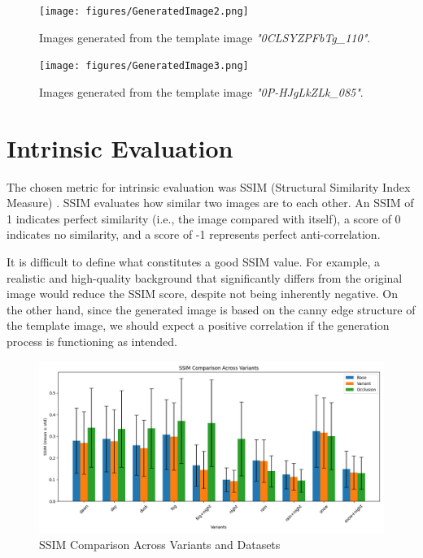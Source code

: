 \begin{figure}[htbp]
\centering
\texttt{[image: figures/GeneratedImage2.png]}
  \caption{Images generated from the template image \emph{"0CLSYZPFbTg\_110"}.}
\label{fig:noise_to_image}
\end{figure}

\begin{figure}[htbp]
\centering
\texttt{[image: figures/GeneratedImage3.png]}
  \caption{Images generated from the template image \emph{"0P-HJgLkZLk\_085"}.}
\label{fig:noise_to_image}
\end{figure}

\FloatBarrier
\section{Intrinsic Evaluation}

The chosen metric for intrinsic evaluation was SSIM (Structural Similarity Index Measure) \cite{wang_image_2004}. 
SSIM evaluates how similar two images are to each other. 
An SSIM of 1 indicates perfect similarity (i.e., the image compared with itself), a score of 0 indicates no similarity, and a score of -1 represents perfect anti-correlation.

It is difficult to define what constitutes a good SSIM value. 
For example, a realistic and high-quality background that significantly differs from the original image would reduce the SSIM score, despite not being inherently negative. 
On the other hand, since the generated image is based on the canny edge structure of the template image, we should expect a positive correlation if the generation process is functioning as intended.

\begin{figure}[htbp]
\hspace*{-2.5cm} %
\includegraphics[width=1.5\textwidth]{figures/SSIM.png}
  \caption{SSIM Comparison Across Variants and Datasets}
\label{fig:noise_to_image}
\end{figure}

